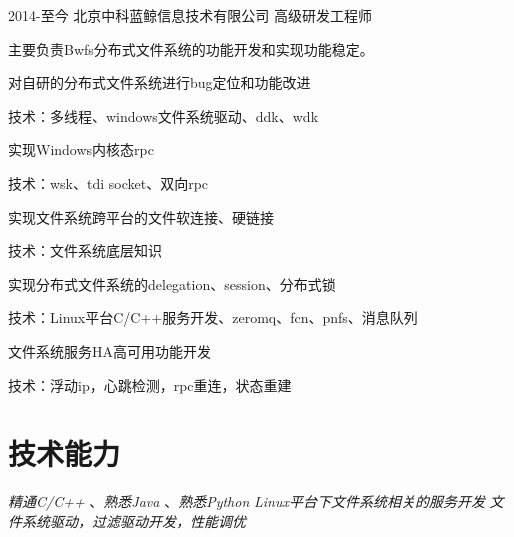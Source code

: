 \documentclass[10pt]{article} %
\begin{document}
\job
{2014-至今}
{北京中科蓝鲸信息技术有限公司}
{高级研发工程师}
{主要负责Bwfs分布式文件系统的功能开发和实现功能稳定。
\begin{itemize-noindent}
\item{对自研的分布式文件系统进行bug定位和功能改进}
\item{技术：多线程、windows文件系统驱动、ddk、wdk}
\item{实现Windows内核态rpc}
\item{技术：wsk、tdi socket、双向rpc}
\item{实现文件系统跨平台的文件软连接、硬链接}
\item{技术：文件系统底层知识}
\item{实现分布式文件系统的delegation、session、分布式锁}
\item{技术：Linux平台C/C++服务开发、zeromq、fcn、pnfs、消息队列}
\item{文件系统服务HA高可用功能开发}
\item{技术：浮动ip，心跳检测，rpc重连，状态重建}
\end{itemize-noindent}
}
\section{技术能力}
{
\textit{精通C/C++} 、\textit{熟悉Java} 、\textit{熟悉Python}
}
{
\textit{Linux平台下文件系统相关的服务开发}
}
{
\textit{文件系统驱动，过滤驱动开发，性能调优}
}
\end{document}
